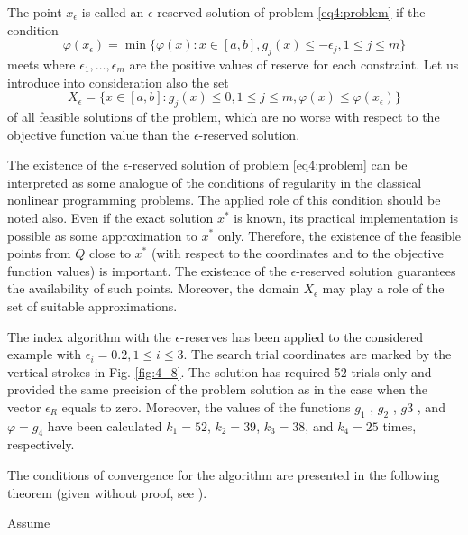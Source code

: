 \documentclass[graybox]{svmult}
\begin{document}
\begin{definition}
  The point $x_\epsilon$ is called an $\epsilon$-reserved solution of problem \eqref{eq4:problem} if the condition
  \begin{equation}
    \varphi(x_\epsilon)=\min\{\varphi(x):x\in [a,b], g_j(x)\le -\epsilon_j,1\le j\le m\}
  \end{equation}
  meets where $\epsilon_1, \dots,\epsilon_m$ are the positive values of reserve for each constraint. Let us introduce into consideration also the set
  \begin{equation}
  X_\epsilon = \{x\in[a,b]:g_j(x)\le 0, 1\le j\le m, \varphi(x)\le\varphi(x_\epsilon)\}
  \end{equation}
  of all feasible solutions of the problem, which are no worse with respect to the objective function value than the $\epsilon$-reserved solution.
\end{definition}

The existence of the $\epsilon$-reserved solution of problem \eqref{eq4:problem} can be interpreted as some analogue of the conditions of regularity in the classical nonlinear programming problems. The applied role of this condition should be noted also. Even if the exact solution $x^*$ is known, its practical implementation is possible as some approximation to $x^*$ only. Therefore, the existence of the feasible points from $Q$ close to $x^*$ (with respect to the coordinates and to the objective
function values) is important. The existence of the $\epsilon$-reserved solution guarantees the availability of such points. Moreover, the domain $X_\epsilon$ may play a role of the set of suitable approximations.

The index algorithm with the $\epsilon$-reserves has been applied to the considered example with $\epsilon_i=0.2, 1\le i\le 3$. The search trial coordinates are marked by the vertical strokes in Fig. \ref{fig:4_8}. The solution has required 52 trials only and provided the same precision of the problem solution as in
the case when the vector $\epsilon_R$ equals to zero. Moreover, the values of the functions $g_1$ , $g_2$ , $g 3$ , and $\varphi=g_4$ have been calculated $k_1 =52$, $k_2 =39$, $k_3 =38$, and $k_4 =25$ times, respectively.

The conditions of convergence for the algorithm are presented in the following theorem (given without proof, see \cite{}).

\begin{theorem}
  Assume
\end{theorem}
\end{document}
